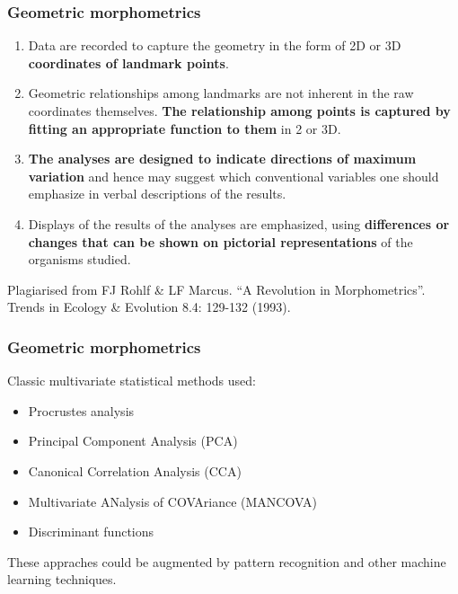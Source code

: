 \begin{frame}
\frametitle{Geometric morphometrics}
\begin{enumerate}
\item Data are recorded to capture the geometry in the form of 2D or 3D {\bf coordinates of landmark points}.
\item Geometric relationships among landmarks are not inherent in the raw coordinates themselves.  {\bf The relationship among points is captured by fitting an appropriate function to them} in 2 or 3D.
\item {\bf The analyses are designed to indicate directions of maximum variation} and hence may suggest which conventional variables one should emphasize in verbal descriptions of the results.
\item Displays of the results of the analyses are emphasized, using {\bf differences or changes that can be shown on pictorial representations} of the organisms studied.  
\end{enumerate}

\vspace{0.25cm}

\begin{tiny}
Plagiarised from FJ Rohlf \& LF Marcus. ``A Revolution in Morphometrics''. Trends in Ecology \& Evolution 8.4: 129-132 (1993).\par
\end{tiny}
\end{frame}



\begin{frame}
\frametitle{Geometric morphometrics}
Classic multivariate statistical methods used:
\begin{itemize}
\item Procrustes analysis
\item Principal Component Analysis (PCA)
\item Canonical Correlation Analysis (CCA)
\item Multivariate ANalysis of COVAriance (MANCOVA)
\item Discriminant functions
\end{itemize}
These appraches could be augmented by pattern recognition and other machine learning techniques.
\end{frame}



